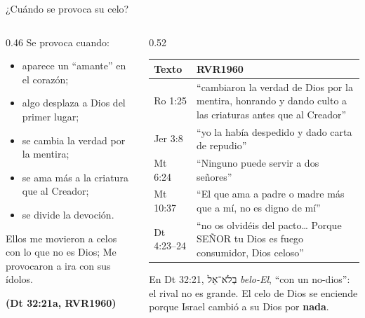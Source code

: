 \documentclass[hyperref={bookmarks=false},aspectratio=169]{beamer}
\newcommand{\heb}[1]{\mbox{\foreignlanguage{hebrew}{#1}}}
\newcommand{\SENOR}{S{\fontsize{0.78em}{1em}\selectfont EÑOR}}
\newcommand{\fuente}[1]{\par\hfill{\upshape\bfseries\footnotesize\textcolor{azul}{#1}}}
\newcommand{\destacar}[1]{\textbf{\textcolor{azul}{#1}}}
\begin{document}
\begin{frame}{¿Cuándo se provoca su celo?}
\begin{columns}[t,onlytextwidth]
\begin{column}{0.46\textwidth}\footnotesize
Se provoca cuando:
\begin{itemize}\setlength{\itemsep}{0pt}
\item aparece un ``amante'' en el corazón;
\item algo desplaza a Dios del primer lugar;
\item se cambia la verdad por la mentira;
\item se ama más a la criatura que al Creador;
\item se divide la devoción.
\end{itemize}
\begin{cita}Ellos me movieron a celos con lo que no es Dios; Me provocaron a ira con sus ídolos.\fuente{(Dt 32:21a, RVR1960)}\end{cita}
\end{column}
\begin{column}{0.52\textwidth}
\scriptsize\renewcommand{\arraystretch}{1.15}
\begin{tabular}{@{}>{\RaggedRight\arraybackslash}p{1.5cm}>{\RaggedRight\arraybackslash}p{4.6cm}@{}}
\toprule
\textbf{Texto} & \textbf{RVR1960} \\ \midrule
Ro 1:25 & ``cambiaron la verdad de Dios por la mentira, honrando y dando culto a las criaturas antes que al Creador'' \\
Jer 3:8 & ``yo la había despedido y dado carta de repudio'' \\
Mt 6:24 & ``Ninguno puede servir a dos señores'' \\
Mt 10:37 & ``El que ama a padre o madre más que a mí, no es digno de mí'' \\
Dt 4:23--24 & ``no os olvidéis del pacto\ldots{} Porque \SENOR{} tu Dios es fuego consumidor, Dios celoso'' \\
\bottomrule
\end{tabular}\par\smallskip
En Dt 32:21, \heb{בְלֹא־אֵל} \emph{belo-El}, ``con un no-dios'': el rival no es grande. El celo de Dios se enciende porque Israel cambió a su Dios por \destacar{nada}.
\end{column}
\end{columns}
\end{frame}
\end{document}
